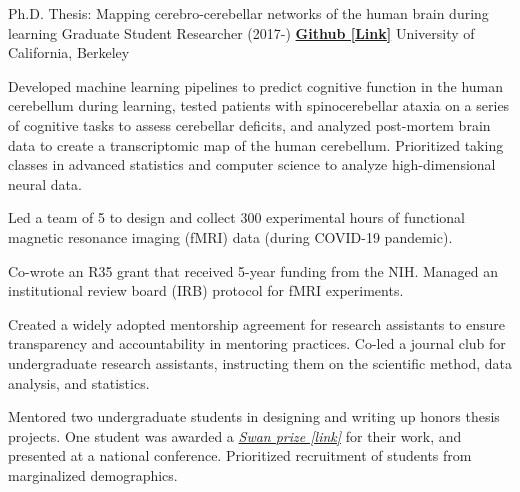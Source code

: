 

\begin{cventries}

  \cventry
  	{Ph.D. Thesis: Mapping cerebro-cerebellar networks of the human brain during learning}
    {Graduate Student Researcher (2017-)} %
    {\href{https://github.com/maedbhk/cerebellum_learning_connect}{\textbf{Github [Link]}}}
    {University of California, Berkeley} %
    {
      \begin{cvitems} %
        \item {Developed machine learning pipelines to predict cognitive function in the human cerebellum during learning, tested patients with spinocerebellar ataxia on a series of cognitive tasks to assess cerebellar deficits, and analyzed post-mortem brain data to create a transcriptomic map of the human cerebellum. Prioritized taking classes in advanced statistics and computer science to analyze high-dimensional neural data.} 
        \item {Led a team of 5 to design and collect 300 experimental hours of functional magnetic resonance imaging (fMRI) data (during COVID-19 pandemic).}
        \item {Co-wrote an R35 grant that received 5-year funding from the NIH. Managed an institutional review board (IRB) protocol for fMRI experiments.}
        \item {Created a widely adopted mentorship agreement for research assistants to ensure transparency and accountability in mentoring practices. Co-led a journal club for undergraduate research assistants, instructing them on the scientific method, data analysis, and statistics.}
        \item {Mentored two undergraduate students in designing and writing up honors thesis projects. One student was awarded a \href{https://psychology.berkeley.edu/sites/default/files/undergraduate-program/swanaward_application_2019-2020.pdf}{\textit{Swan prize [link]}} for their work, and presented at a national conference. Prioritized recruitment of students from marginalized demographics.}
      \end{cvitems}
    }
    

\end{cventries}
